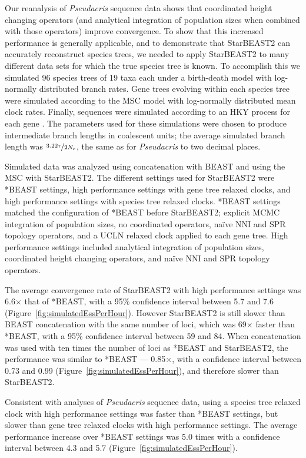 \documentclass[12pt]{article}
\begin{document}
Our reanalysis of \textit{Pseudacris} sequence data shows that coordinated height changing operators
(and analytical integration of population sizes when combined with those operators)
improve convergence. To show that this increased performance is generally
applicable, and to demonstrate that StarBEAST2 can accurately reconstruct
species trees, we needed to apply StarBEAST2 to many different data sets for
which the true species tree is known. To accomplish this we simulated 96 species
trees of 19 taxa each under a birth-death model with log-normally distributed
branch rates. Gene trees evolving within each species tree were simulated
according to the MSC model with log-normally distributed mean clock rates.
Finally, sequences were simulated according to an HKY process for each gene
\citep{Hasegawa1985, Goldman1993}. The parameters used for these simulations
were chosen to produce intermediate branch lengths in coalescent units; the
average simulated branch length was $\nicefrac{3.22\tau}{2N_e}$, the same as for
\textit{Pseudacris} to two decimal places.

Simulated data was analyzed using concatenation with BEAST and using the MSC with
StarBEAST2. The different settings used for StarBEAST2 were *BEAST settings,
high performance settings with gene tree relaxed clocks, and high performance settings with
species tree relaxed clocks. *BEAST settings matched the configuration of *BEAST
before StarBEAST2; explicit MCMC integration of population sizes, no
coordinated operators, na\"ive NNI and SPR topology operators, and a UCLN
relaxed clock applied to each gene tree. High performance settings included analytical
integration of population sizes, coordinated height changing operators, and
na\"ive NNI and SPR topology operators.

The average convergence rate of StarBEAST2 with high performance settings
was 6.6$\times$ that of *BEAST, with a 95\% confidence interval between
5.7 and 7.6 (Figure~\ref{fig:simulatedEssPerHour}). However StarBEAST2 is still
slower than BEAST concatenation with the same number of loci, which was 69$\times$
faster than *BEAST, with a 95\% confidence interval between 59 and 84. When
concatenation was used with ten times the number of loci as *BEAST and StarBEAST2, the
performance was similar to *BEAST --- 0.85$\times$, with a confidence interval
between 0.73 and 0.99 (Figure~\ref{fig:simulatedEssPerHour}), and therefore
slower than StarBEAST2.

Consistent with analyses of \textit{Pseudacris} sequence data, using a species
tree relaxed clock with high performance settings was faster than *BEAST settings, but slower than
gene tree relaxed clocks with high performance settings. The average performance
increase over *BEAST settings was 5.0 times with a confidence interval
between 4.3 and 5.7 (Figure~\ref{fig:simulatedEssPerHour}).
\end{document}
